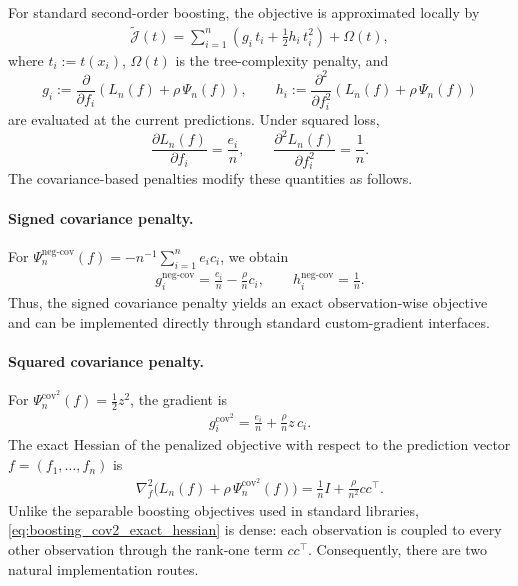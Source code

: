 \documentclass[12pt, draft]{article}
\theoremstyle{plain}
\theoremstyle{definition}
\newcommand{\1}{\mathbf{1}}
\begin{document}
For standard second-order boosting, the objective is approximated locally by
\begin{align}
    \label{eq:boosting_local_objective}
    \widetilde{\mathcal J}(t)
    =
    \sum_{i=1}^n
    \left(
        g_i\,t_i + \frac{1}{2}h_i\,t_i^2
    \right)
    +
    \Omega(t),
\end{align}
where \(t_i := t(x_i)\), \(\Omega(t)\) is the tree-complexity penalty, and
\[
g_i := \frac{\partial}{\partial f_i}
\left(
L_n(f) + \rho\,\Psi_n(f)
\right),
\qquad
h_i := \frac{\partial^2}{\partial f_i^2}
\left(
L_n(f) + \rho\,\Psi_n(f)
\right)
\]
are evaluated at the current predictions. Under squared loss,
\[
\frac{\partial L_n(f)}{\partial f_i} = \frac{e_i}{n},
\qquad
\frac{\partial^2 L_n(f)}{\partial f_i^2} = \frac{1}{n}.
\]
The covariance-based penalties modify these quantities as follows.

\paragraph{Signed covariance penalty.}
For \(\Psi_n^{\mathrm{neg\mbox{-}cov}}(f) = -n^{-1}\sum_{i=1}^n e_i c_i\), we obtain
\begin{align}
    \label{eq:boosting_negcov_grad_hess}
    g_i^{\mathrm{neg\mbox{-}cov}}
    =
    \frac{e_i}{n}
    -
    \frac{\rho}{n}c_i,
    \qquad
    h_i^{\mathrm{neg\mbox{-}cov}}
    =
    \frac{1}{n}.
\end{align}
Thus, the signed covariance penalty yields an exact observation-wise objective and can be implemented directly through standard custom-gradient interfaces.

\paragraph{Squared covariance penalty.}
For \(\Psi_n^{\mathrm{cov}^2}(f)=\tfrac12 z^2\), the gradient is
\begin{align}
    \label{eq:boosting_cov2_gradient}
    g_i^{\mathrm{cov}^2}
    =
    \frac{e_i}{n}
    +
    \frac{\rho}{n}z\,c_i.
\end{align}
The exact Hessian of the penalized objective with respect to the prediction vector \(f=(f_1,\dots,f_n)\) is
\begin{align}
    \label{eq:boosting_cov2_exact_hessian}
    \nabla_f^2
    \bigl(L_n(f)+\rho\,\Psi_n^{\mathrm{cov}^2}(f)\bigr)
    =
    \frac{1}{n}I
    +
    \frac{\rho}{n^2}cc^\top.
\end{align}
Unlike the separable boosting objectives used in standard libraries, \eqref{eq:boosting_cov2_exact_hessian} is dense: each observation is coupled to every other observation through the rank-one term \(cc^\top\). Consequently, there are two natural implementation routes.
\end{document}
